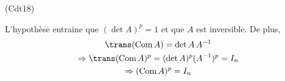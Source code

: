 \begin{tiny}(Cdt18)\end{tiny} L'hypothèse entraine que $(\det A)^p=1$ et que $A$ est inversible. De plus,
\begin{multline*}
 \trans (\mathrm{Com }\,A ) = \det A \, A^{-1}\\
\Rightarrow \trans (\mathrm{Com }\,A )^p = (\det A)^p (A^{-1})^p = I_n\\
\Rightarrow (\mathrm{Com }\,A )^p = I_n
\end{multline*}

 
